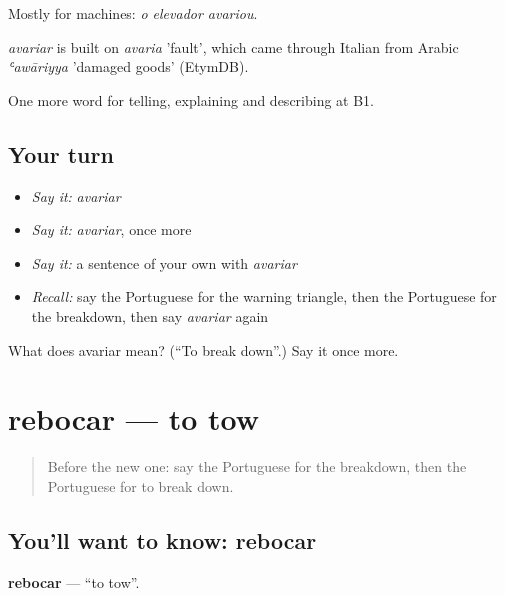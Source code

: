 Mostly for machines: \emph{o elevador avariou}.

\begin{cousinweb}
\emph{avariar} is built on \emph{avaria} 'fault', which came through Italian from Arabic \emph{ʿawāriyya} 'damaged goods' (EtymDB).
\end{cousinweb}

\begin{grammarlens}[title={What you've built}]
One more word for telling, explaining and describing at B1.
\end{grammarlens}

\subsection*{Your turn}
\begin{itemize}
\raggedright
  \item \emph{Say it:} \emph{avariar}
  \item \emph{Say it:} \emph{avariar}, once more
  \item \emph{Say it:} a sentence of your own with \emph{avariar}
  \item \emph{Recall:} say the Portuguese for the warning triangle, then the Portuguese for the breakdown, then say \emph{avariar} again
\end{itemize}

\begin{tcolorbox}[breakable,colback=teal!4,colframe=teal!35!black,title={Before you move on}]
What does avariar mean? (\textquotedblleft{}To break down\textquotedblright{}.) Say it once more.
\end{tcolorbox}
\section[rebocar]{rebocar — to tow}

\label{lesson:PT-C406-rebocar}



\begin{quote}
Before the new one: say the Portuguese for the breakdown, then the Portuguese for to break down.
\end{quote}

\subsection*{You'll want to know: rebocar}
\textbf{rebocar} — \textquotedblleft{}to tow\textquotedblright{}.

